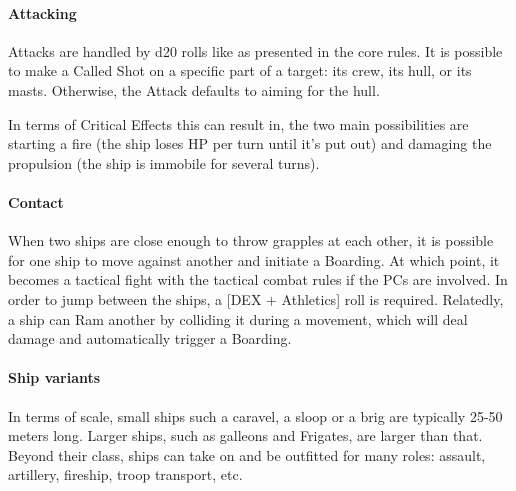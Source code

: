 \paragraph{Attacking}

Attacks are handled by d20 rolls like as presented in the core rules. It is possible to make a Called Shot on a specific part of a target: its crew, its hull, or its masts. Otherwise, the Attack defaults to aiming for the hull.

In terms of Critical Effects this can result in, the two main possibilities are starting a fire (the ship loses HP per turn until it's put out) and damaging the propulsion (the ship is immobile for several turns). 

\paragraph{Contact}

When two ships are close enough to throw grapples at each other, it is possible for one ship to move against another and initiate a Boarding. At which point, it becomes a tactical fight with the tactical combat rules if the PCs are involved. In order to jump between the ships, a [DEX + Athletics] roll is required. Relatedly, a ship can Ram another by colliding it during a movement, which will deal damage and automatically trigger a Boarding. 

\paragraph{Ship variants}

In terms of scale, small ships such a caravel, a sloop or a brig are typically 25-50 meters long. Larger ships, such as galleons and Frigates, are larger than that. Beyond their class, ships can take on and be outfitted for many roles: assault, artillery, fireship, troop transport, etc.








